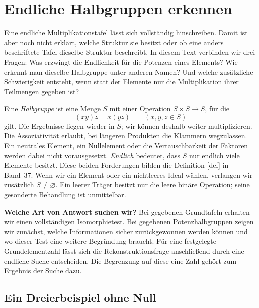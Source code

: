 \chapter*{Endliche Halbgruppen erkennen}
\hypertarget{finite-semigroups.reading}{}

Eine endliche Multiplikationstafel lässt sich vollständig hinschreiben.
Damit ist aber noch nicht erklärt, welche Struktur sie besitzt oder ob
eine anders beschriftete Tafel dieselbe Struktur beschreibt. In diesem
Text verbinden wir drei Fragen: Was erzwingt die Endlichkeit für die
Potenzen eines Elements? Wie erkennt man dieselbe Halbgruppe unter
anderen Namen? Und welche zusätzliche Schwierigkeit entsteht, wenn
statt der Elemente nur die Multiplikation ihrer Teilmengen gegeben ist?

Eine \emph{Halbgruppe} ist eine Menge \(S\) mit einer Operation
\(S\times S\to S\), für die
\[
  (xy)z=x(yz)\qquad(x,y,z\in S)
\]
gilt. Die Ergebnisse liegen wieder in \(S\); wir können deshalb weiter
multiplizieren. Die Assoziativität erlaubt, bei längeren Produkten die
Klammern wegzulassen. Ein neutrales Element, ein Nullelement oder die
Vertauschbarkeit der Faktoren werden dabei nicht vorausgesetzt.
\emph{Endlich} bedeutet, dass \(S\) nur endlich viele Elemente besitzt.
Diese beiden Forderungen bilden die Definition
[def] in Band~37.
Wenn wir ein Element oder ein nichtleeres Ideal wählen, verlangen wir
zusätzlich \(S\ne\varnothing\). Ein leerer Träger besitzt nur die
leere binäre Operation; seine gesonderte Behandlung ist unmittelbar.

\medskip\noindent\textbf{Welche Art von Antwort suchen wir?}
Bei gegebenen Grundtafeln erhalten wir einen vollständigen
Isomorphietest. Bei gegebenen Potenzhalbgruppen zeigen wir zunächst,
welche Informationen sicher zurückgewonnen werden können und wo dieser
Test eine weitere Begründung braucht. Für eine festgelegte
Grundelementzahl lässt sich die Rekonstruktionsfrage anschließend durch
eine endliche Suche entscheiden. Die Begrenzung auf diese eine Zahl
gehört zum Ergebnis der Suche dazu.

\section*{Ein Dreierbeispiel ohne Null}
\hypertarget{finite-semigroups.reading.example}{}

